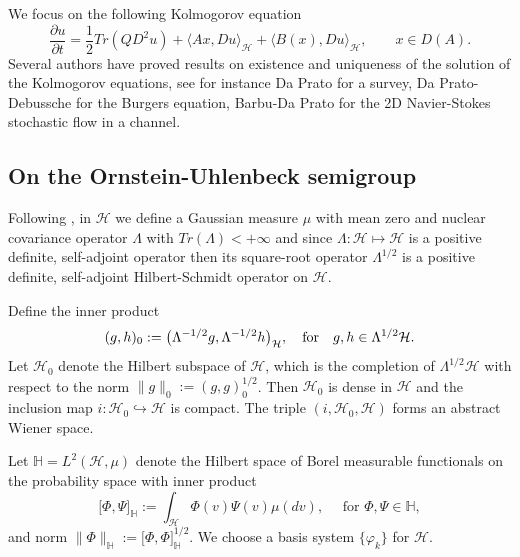 \documentclass[review, onefignum, onetabnum]{siamart171218}
\begin{document}
    We focus on the following Kolmogorov equation
\begin{equation}
    \label{P1s2.3}
    \frac{\partial u}{\partial t}= \frac{1}{2}Tr(QD^2u)+ \langle Ax, Du
    \rangle_\mathcal{H} + \langle B(x),Du \rangle_\mathcal{H},\qquad x\in D(A).
\end{equation}
    Several authors have proved results on existence and uniqueness of the
solution of the Kolmogorov equations, see for instance Da Prato \cite{da} for a
survey, Da Prato-Debussche \cite{da-de} for the Burgers equation,  Barbu-Da
Prato \cite{ba-da} for the 2D Navier-Stokes stochastic flow in a channel.
%
\subsection{On the Ornstein-Uhlenbeck semigroup}\label{OUS-sect}
    Following \cite{liu},  in $\mathcal{H}$ we define a Gaussian measure $\mu$
with mean zero and nuclear covariance operator $\Lambda$ with
${Tr(\Lambda)<+\infty}$ and since $\Lambda:\mathcal{H}\mapsto \mathcal{H}$ is a
positive definite, self-adjoint operator then its square-root operator
$\Lambda^{1/2}$ is a positive definite, self-adjoint Hilbert-Schmidt operator
on $\mathcal{H}$.

    Define the inner product
\[
    ( g, h )_0 := \big( \Lambda^{-1/2}g ,  \Lambda^{-1/2} h \big)_\mathcal{H},
    \quad \hbox{\rm for}\quad g,h\in \Lambda^{1/2} \mathcal{H}.
\]
Let $\mathcal{H}_0$ denote the Hilbert subspace of $\mathcal{H}$, which is the
completion of $\Lambda^{1/2} \mathcal{H}$ with
respect to the norm $\|g\|_0:= ( g, g )_0^{1/2} $. Then ${\mathcal{H}_0}$ is
dense in $\mathcal{H}$ and the inclusion map
$i:\mathcal{H}_0\hookrightarrow\mathcal{H}$ is compact. The triple
$(i,\mathcal{H}_0,\mathcal{H})$ forms an abstract Wiener space.

    Let
$
    \mathbb{H} = L^2 (\mathcal{H}, \mu)
$
denote the Hilbert space of Borel
measurable functionals on the probability space with inner
product
\[
    \big [ \Phi,\Psi\big ]_\mathbb{H}:=\int_{\mathcal{H}} \Phi(v)
    \Psi(v)\mu(dv),\quad
    \text{ for } \Phi,\Psi\in\mathbb{H},
\]
and norm $\|\Phi\|_{\mathbb{H}}:=\big [\Phi,\Phi\big ]_\mathbb{H}^{1/2}$.
We choose a basis system $\{\varphi_k\}$ for $\mathcal{H}$.
\end{document}
